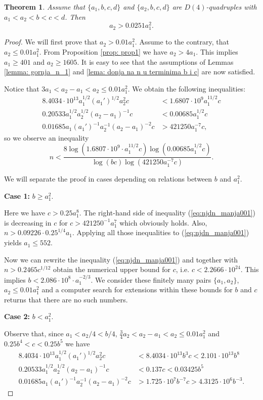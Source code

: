\documentclass[12pt]{amsart}%
\newtheorem{theorem}{Theorem}[section]
\theoremstyle{definition}
\theoremstyle{remark}
\theoremstyle{plain}
\begin{document}
\begin{theorem}
    Assume that $\{a_1,b,c,d\}$ and $\{a_2,b,c,d\}$ are $D(4)$-quadruples with $a_1<a_2<b<c<d$. Then 
       $$a_2>0.0251a_1^2.$$
   
\end{theorem}

\begin{proof}    
We will first prove that $a_2>0.01a_1^2$. 
Assume to the contrary, that $a_2\leq 0.01a_1^2$. From Proposition \ref{prop: prop1} we have $a_2>4a_1$. This implies $a_1\geq 401$ and $a_2\geq 1605.$ 
It is easy to see that the assumptions of Lemmas \ref{lemma: gornja_n_1} and \ref{lema: donja na n u terminima b i c} are now satisfied.

 Notice that $3a_1<a_2-a_1<a_2\leq0.01a_1^2$. We obtain the following inequalities: 
    \begin{align*}
 8.4034\cdot 10^{13}a_1^{1/2}(a_1')^{1/2}a_2^2c&<1.6807\cdot 10^9a_1^{11/2}c\\
 0.20533a_1^{1/2}a_2^{1/2}(a_2-a_1)^{-1}c&<0.00685a_1^{1/2}c\\
 0.01685a_1(a_1')^{-1}a_2^{-1}(a_2-a_1)^{-2}c&>421250a_1^{-7}c,
\end{align*}
so we observe an inequality
\begin{equation}\label{eq:njdn_manja001}
    n<\frac{8\log(1.6807\cdot 10^{9}\cdot a_1^{11/2}c)\log(0.00685a_1^{1/2}c)}{\log(bc)\log(421250a_1^{-7}c)}.
\end{equation}

We will separate the proof in cases depending on relations between $b$ and $a_1^2$. 

\textbf{Case 1:} $b \geq a_1^2$. 

Here we have $c>0.25a_1^8$. The right-hand side of inequality (\ref{eq:njdn_manja001}) is decreasing in $c$ for $c>421250^{-1}a_1^7$ which obviously holds. Also, $n>0.09226\cdot 0.25^{1/4}a_1$. Applying all those inequalities to (\ref{eq:njdn_manja001}) yields $a_1\leq 552$. 

Now we can rewrite the inequality (\ref{eq:njdn_manja001}) and together with  $n>0.2465c^{1/12}$ 
obtain the numerical upper bound for  $c$, i.e. $c<2.2666\cdot 10^{24}$. This implies $b<2.086\cdot 10^{8}\cdot a_1^{-2/3}$. We consider these finitely many pairs $\{a_1,a_2\}$, $a_2\leq 0.01a_1^2$ and a computer search for extensions within these bounds for $b$ and $c$ returns that there are no such numbers.

\textbf{Case 2:} $b<a_1^2$. 

Observe that, since $a_1<a_2/4<b/4$, $\frac{3}{4}a_2<a_2-a_1<a_2\leq 0.01a_1^2$ and $0.25b^4<c<0.25b^5$ we have
   \begin{align*}
 8.4034\cdot 10^{13}a_1^{1/2}(a_1')^{1/2}a_2^2c&<8.4034\cdot 10^{13}b^3c<2.101\cdot 10^{13}b^8\\
 0.20533a_1^{1/2}a_2^{1/2}(a_2-a_1)^{-1}c&<0.137c<0.03425b^5\\
 0.01685a_1(a_1')^{-1}a_2^{-1}(a_2-a_1)^{-2}c&>1.725\cdot 10^7b^{-7}c>4.3125\cdot 10^6b^{-3}. 
\end{align*}


\end{proof}
\end{document}
